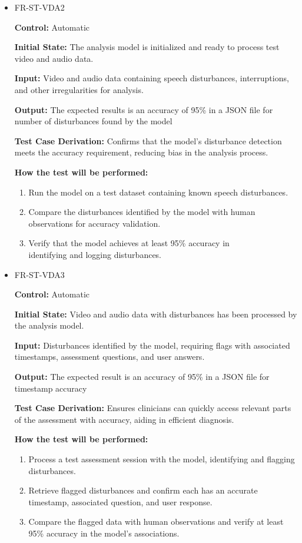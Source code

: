 \documentclass[12pt, titlepage]{article}
\begin{document}
\begin{itemize}
  \item FR-ST-VDA2
  \begin{mdframed}[linewidth=0.5mm]
      \textbf{Control:} Automatic \par
      \textbf{Initial State:} The analysis model is initialized and ready to process test video and audio data. \par
      \textbf{Input:} Video and audio data containing speech disturbances, interruptions, and other irregularities for analysis. \par
      \textbf{Output:} The expected results is an accuracy of 95\% in a JSON file for number of disturbances found by the model \par
      \textbf{Test Case Derivation:} Confirms that the model’s disturbance detection meets the accuracy requirement, reducing bias in the analysis process. \par
      \textbf{How the test will be performed:}
      \begin{enumerate}[noitemsep]
        \item Run the model on a test dataset containing known speech disturbances.
        \item Compare the disturbances identified by the model with human observations for accuracy validation.
        \item Verify that the model achieves at least 95\% accuracy in \\identifying and logging disturbances.
      \end{enumerate}
  \end{mdframed}

  \item FR-ST-VDA3
  \begin{mdframed}[linewidth=0.5mm]
      \textbf{Control:} Automatic \par
      \textbf{Initial State:} Video and audio data with disturbances has been processed by the analysis model. \par
      \textbf{Input:} Disturbances identified by the model, requiring flags with associated timestamps, assessment questions, and user answers. \par
      \textbf{Output:} The expected result is an accuracy of 95\% in a JSON file for timestamp accuracy\par
      \textbf{Test Case Derivation:} Ensures clinicians can quickly access relevant parts of the assessment with accuracy, aiding in efficient diagnosis. \par
      \textbf{How the test will be performed:}
      \begin{enumerate}[noitemsep]
        \item Process a test assessment session with the model, identifying and flagging disturbances.
        \item Retrieve flagged disturbances and confirm each has an accurate timestamp, associated question, and user response.
        \item Compare the flagged data with human observations and verify at least 95\% accuracy in the model’s associations.
      \end{enumerate}
  \end{mdframed}
\end{itemize}
\end{document}
